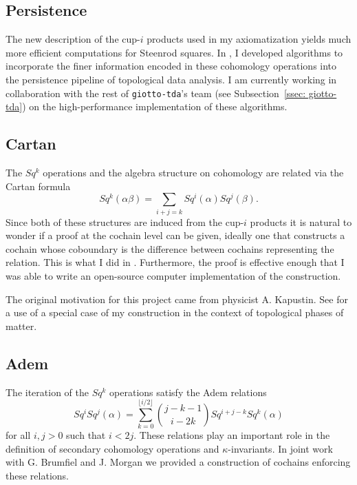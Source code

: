 \subsection{Persistence}
The new description of the cup-$i$ products used in my axiomatization \cite{medina2018axiomatic} yields much more efficient computations for Steenrod squares.
In \cite{medina2018persistence}, I developed algorithms to incorporate the finer information encoded in these cohomology operations into the persistence pipeline of topological data analysis.
I am currently working in collaboration with the rest of \texttt{giotto-tda}'s team (see Subsection~\ref{ssec: giotto-tda}) on the high-performance implementation of these algorithms.

\subsection{Cartan}
The $Sq^k$ operations and the algebra structure on cohomology are related via the Cartan formula
\begin{equation*}
Sq^k(\alpha \beta) = \sum_{i+j=k} Sq^i(\alpha) Sq^j(\beta).
\end{equation*}
Since both of these structures are induced from the cup-$i$ products it is natural to wonder if a proof at the cochain level can be given, ideally one that constructs a cochain whose coboundary is the difference between cochains representing the relation.
This is what I did in \cite{medina2020cartan}.
Furthermore, the proof is effective enough that I was able to write an open-source computer implementation of the construction.

The original motivation for this project came from physicist A. Kapustin.
See \cite{kapustin2017fermionic} for a use of a special case of my construction in the context of topological phases of matter.

\subsection{Adem}
The iteration of the $Sq^k$ operations satisfy the Adem relations
\begin{equation*}
Sq^i Sq^j(\alpha) = \sum_{k=0}^{\lfloor i/2 \rfloor} \binom{j-k-1}{i-2k} Sq^{i+j-k} Sq^k(\alpha)
\end{equation*}
for all $i,j>0$ such that $i< 2j$.
These relations play an important role in the definition of secondary cohomology operations and $\kappa$-invariants.
In joint work with G. Brumfiel and J. Morgan \cite{medina2021adem} we provided a construction of cochains enforcing these relations.

